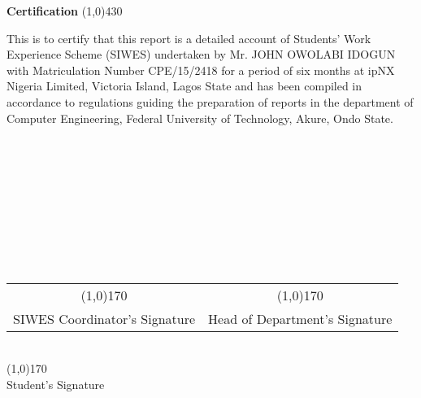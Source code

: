 \begin{center}
{\huge \bf Certification}
\line(1,0){430}
\end{center}



This is to certify that this report is a detailed account of Students' Work Experience Scheme (SIWES) undertaken by Mr. JOHN OWOLABI IDOGUN with Matriculation Number CPE/15/2418 for a period of six months at ipNX Nigeria Limited, Victoria Island, Lagos State and has been compiled in accordance to regulations guiding the preparation of reports in the department of Computer Engineering, Federal University of Technology, Akure, Ondo State.\\\\\\\\\\\\\\\\\\\

\begin{center}
	\begin{tabular}{c c}
	 \line(1,0){170} & \hspace{2.5cm} \line(1,0){170}\\
	 SIWES Coordinator's Signature  & \hspace{2.5cm} Head of Department's Signature\\
	\end{tabular}\\
	\vspace{1.0in}
	\line(1,0){170}\\Student's Signature
\end{center}